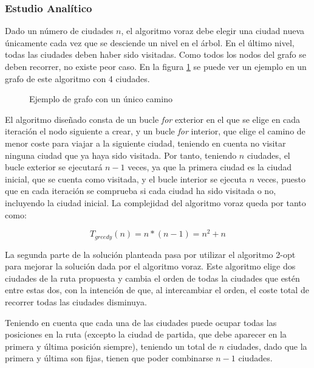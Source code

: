 \documentclass{uc3mpracticas}
\begin{document}
  \subsubsection{Estudio Analítico}

  Dado un número de ciudades $n$, el algoritmo voraz debe elegir una ciudad nueva únicamente cada vez que se desciende un nivel en el árbol. En el último nivel, todas las ciudades deben haber sido visitadas. Como todos los nodos del grafo se deben recorrer, no existe peor caso. En la figura \ref{fig:ejGreedy} se puede ver un ejemplo en un grafo de este algoritmo con 4 ciudades.

  \begin{figure}[!h]
    \caption{Ejemplo de grafo con un único camino}
    \label{fig:ejGreedy}
  \end{figure}

  El algoritmo diseñado consta de un bucle \textit{for} exterior en el que se elige en cada iteración el nodo siguiente a crear, y un bucle \textit{for} interior, que elige el camino de menor coste para viajar a la siguiente ciudad, teniendo en cuenta no visitar ninguna ciudad que ya haya sido visitada. Por tanto, teniendo $n$ ciudades, el bucle exterior se ejecutará $n - 1$ veces, ya que la primera ciudad es la ciudad inicial, que se cuenta como visitada, y el bucle interior se ejecuta $n$ veces, puesto que en cada iteración se comprueba si cada ciudad ha sido visitada o no, incluyendo la ciudad inicial. La complejidad del algoritmo voraz queda por tanto como:

  $$T_{greedy}(n) = n*(n-1) = n^2 + n$$

  \vspace{2mm}

  La segunda parte de la solución planteada pasa por utilizar el algoritmo 2-opt para mejorar la solución dada por el algoritmo voraz. Este algoritmo elige dos ciudades de la ruta propuesta y cambia el orden de todas la ciudades que estén entre estas dos, con la intención de que, al intercambiar el orden, el coste total de recorrer todas las ciudades disminuya.

  \vspace{2mm}

  Teniendo en cuenta que cada una de las ciudades puede ocupar todas las posiciones en la ruta (excepto la ciudad de partida, que debe aparecer en la primera y última posición siempre), teniendo un total de $n$ ciudades, dado que la primera y última son fijas, tienen que poder combinarse $n-1$ ciudades.
\end{document}
